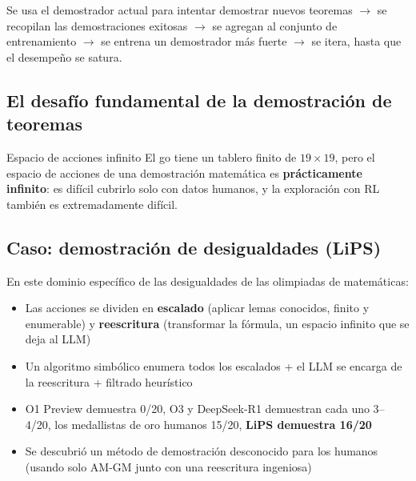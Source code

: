Se usa el demostrador actual para intentar demostrar nuevos teoremas $\to$ se recopilan las demostraciones exitosas $\to$ se agregan al conjunto de entrenamiento $\to$ se entrena un demostrador más fuerte $\to$ se itera, hasta que el desempeño se satura.

\subsection{El desafío fundamental de la demostración de teoremas}

\begin{warningbox}{Espacio de acciones infinito}
El go tiene un tablero finito de $19\times19$, pero el espacio de acciones de una demostración matemática es \textbf{prácticamente infinito}: es difícil cubrirlo solo con datos humanos, y la exploración con RL también es extremadamente difícil.
\end{warningbox}

\subsection{Caso: demostración de desigualdades (LiPS)}

En este dominio específico de las desigualdades de las olimpiadas de matemáticas:
\begin{itemize}
    \item Las acciones se dividen en \textbf{escalado} (aplicar lemas conocidos, finito y enumerable) y \textbf{reescritura} (transformar la fórmula, un espacio infinito que se deja al LLM)
    \item Un algoritmo simbólico enumera todos los escalados + el LLM se encarga de la reescritura + filtrado heurístico
    \item O1 Preview demuestra 0/20, O3 y DeepSeek-R1 demuestran cada uno 3--4/20, los medallistas de oro humanos 15/20, \textbf{LiPS demuestra 16/20}
    \item Se descubrió un método de demostración desconocido para los humanos (usando solo AM-GM junto con una reescritura ingeniosa)
\end{itemize}
